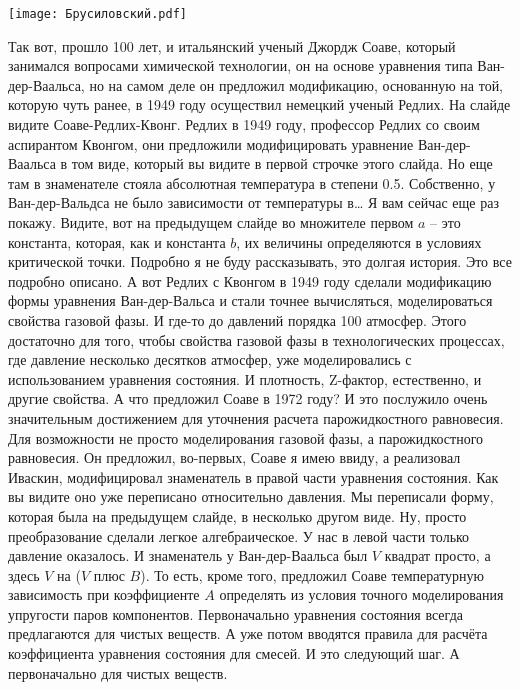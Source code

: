 \documentclass[main.tex]{subfiles}
\begin{document}
\begin{center}
\texttt{[image: Брусиловский.pdf]}
\end{center}

Так вот, прошло 100 лет, и итальянский ученый Джордж Соаве, который занимался вопросами химической технологии, он на основе уравнения типа Ван-дер-Ваальса, но на самом деле он предложил модификацию, основанную на той, которую чуть ранее, в 1949 году осуществил немецкий ученый Редлих.
На слайде видите Соаве-Редлих-Квонг.
Редлих в 1949 году, профессор Редлих со своим аспирантом Квонгом, они предложили модифицировать уравнение Ван-дер-Ваальса в том виде, который вы видите в первой строчке этого слайда.
Но еще там в знаменателе стояла абсолютная температура в степени 0.5.
Собственно, у Ван-дер-Вальдса не было зависимости от температуры в…
Я вам сейчас еще раз покажу.
Видите, вот на предыдущем слайде во множителе первом $a$ -- это константа, которая, как и константа $b$, их величины определяются в условиях критической точки.
Подробно я не буду рассказывать, это долгая история.
Это все подробно описано.
А вот Редлих с Квонгом в 1949 году сделали модификацию формы уравнения Ван-дер-Вальса и стали точнее вычисляться, моделироваться свойства газовой фазы.
И где-то до давлений порядка 100 атмосфер.
Этого достаточно для того, чтобы свойства газовой фазы в технологических процессах, где давление несколько десятков атмосфер, уже моделировались с использованием уравнения состояния.
И плотность, Z-фактор, естественно, и другие свойства.
А что предложил Соаве в 1972 году?
И это послужило очень значительным достижением для уточнения расчета парожидкостного равновесия.
Для возможности не просто моделирования газовой фазы, а парожидкостного равновесия.
Он предложил, во-первых, Соаве я имею ввиду, а реализовал Иваскин, модифицировал знаменатель в правой части уравнения состояния.
Как вы видите оно уже переписано относительно давления.
Мы переписали форму, которая была на предыдущем слайде, в несколько другом виде.
Ну, просто преобразование сделали легкое алгебраическое.
У нас в левой части только давление оказалось.
И знаменатель у Ван-дер-Ваальса был $V$ квадрат просто, а здесь $V$ на ($V$ плюс $B$).
То есть, кроме того, предложил Соаве температурную зависимость при коэффициенте $A$ определять из условия точного моделирования упругости паров компонентов.
Первоначально уравнения состояния всегда предлагаются для чистых веществ.
А уже потом вводятся правила для расчёта коэффициента уравнения состояния для смесей.
И это следующий шаг.
А первоначально для чистых веществ.
\end{document}
